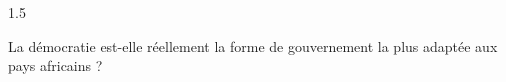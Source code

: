 \documentclass[12pt]{article}
\begin{document}
\begin{spacing}{1.5}

La démocratie est-elle réellement la forme de gouvernement la plus adaptée aux pays africains ?

\quad
\quad

\end{spacing}
\end{document}
